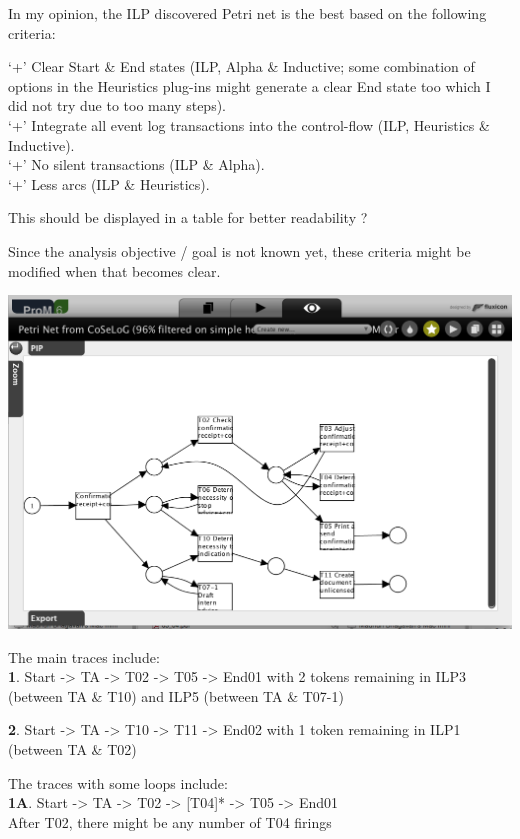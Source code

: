 \documentclass[]{article}
\begin{document}
In my opinion, the ILP discovered Petri net is the best based on the
following criteria:

`+' Clear Start \& End states (ILP, Alpha \& Inductive; some combination
of options in the Heuristics plug-ins might generate a clear End state
too which I did not try due to too many steps).\\`+' Integrate all event
log transactions into the control-flow (ILP, Heuristics \&
Inductive).\\`+' No silent transactions (ILP \& Alpha).\\`+' Less arcs
(ILP \& Heuristics).

This should be displayed in a table for better readability ?

Since the analysis objective / goal is not known yet, these criteria
might be modified when that becomes clear.

\includegraphics{CoSeLoG_Step_05_Filter96_PetriNet_ILP.png}

The main traces include:\\\textbf{1}. Start -\textgreater{} TA
-\textgreater{} T02 -\textgreater{} T05 -\textgreater{} End01 with 2
tokens remaining in ILP3 (between TA \& T10) and ILP5 (between TA \&
T07-1)

\textbf{2}. Start -\textgreater{} TA -\textgreater{} T10 -\textgreater{}
T11 -\textgreater{} End02 with 1 token remaining in ILP1 (between TA \&
T02)

The traces with some loops include:\\\textbf{1A}. Start -\textgreater{}
TA -\textgreater{} T02 -\textgreater{} {[}T04{]}* -\textgreater{} T05
-\textgreater{} End01\\ After T02, there might be any number of T04
firings
\end{document}
